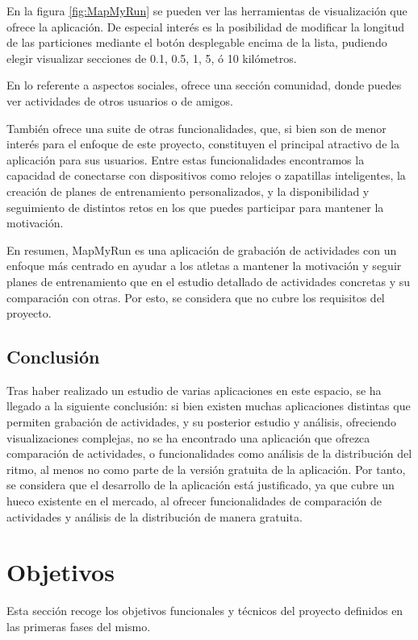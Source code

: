 En la figura \ref{fig:MapMyRun} se pueden ver las herramientas de visualización que ofrece la aplicación. De especial interés es la posibilidad de modificar la longitud de las particiones mediante el botón desplegable encima de la lista, pudiendo elegir visualizar secciones de 0.1, 0.5, 1, 5, ó 10 kilómetros.

En lo referente a aspectos sociales, ofrece una sección comunidad, donde puedes ver actividades de otros usuarios o de amigos. 

También ofrece una suite de otras funcionalidades, que, si bien son de menor interés para el enfoque de este proyecto, constituyen el principal atractivo de la aplicación para sus usuarios. Entre estas funcionalidades encontramos la capacidad de conectarse con dispositivos como relojes o zapatillas inteligentes, la creación de planes de entrenamiento personalizados, y la disponibilidad y seguimiento de distintos retos en los que puedes participar para mantener la motivación.

En resumen, MapMyRun es una aplicación de grabación de actividades con un enfoque más centrado en ayudar a los atletas a mantener la motivación y seguir planes de entrenamiento que en el estudio detallado de actividades concretas y su comparación con otras. Por esto, se considera que no cubre los requisitos del proyecto.

\subsection{Conclusión}
Tras haber realizado un estudio de varias aplicaciones en este espacio, se ha llegado a la siguiente conclusión: si bien existen muchas aplicaciones distintas que permiten grabación de actividades, y su posterior estudio y análisis, ofreciendo visualizaciones complejas, no se ha encontrado una aplicación que ofrezca comparación de actividades, o funcionalidades como análisis de la distribución del ritmo, al menos no como parte de la versión gratuita de la aplicación. Por tanto, se considera que el desarrollo de la aplicación está justificado, ya que cubre un hueco existente en el mercado, al ofrecer funcionalidades de comparación de actividades y análisis de la distribución de manera gratuita.

\section{Objetivos}
Esta sección recoge los objetivos funcionales y técnicos del proyecto definidos en las primeras fases del mismo.

